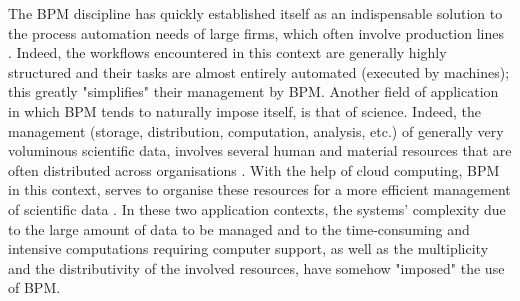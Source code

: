 \label{chap0:sec:bpm-mitigated-use}
The BPM discipline has quickly established itself as an indispensable solution to the process automation needs of large firms, which often involve production lines \cite{van2016don}. Indeed, the workflows encountered in this context are generally highly structured and their tasks are almost entirely automated (executed by machines); this greatly "simplifies" their management by BPM. Another field of application in which BPM tends to naturally impose itself, is that of science. Indeed, the management (storage, distribution, computation, analysis, etc.) of generally very voluminous scientific data, involves several human and material resources that are often distributed across organisations \cite{bell2009beyond}. With the help of cloud computing, BPM in this context, serves to organise these resources for a more efficient management of scientific data \cite{juveGideon, ludascher2006scientific}. In these two application contexts, the systems' complexity due to the large amount of data to be managed and to the time-consuming and intensive computations requiring computer support, as well as the multiplicity and the distributivity of the involved resources, have somehow "imposed" the use of BPM.


